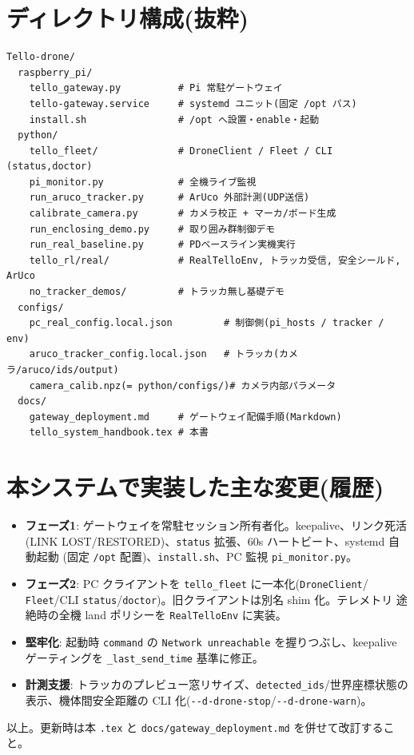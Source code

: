 \documentclass[11pt,a4paper]{ltjsarticle}
\newcommand{\code}[1]{\texttt{\small #1}}
\begin{document}
\section{ディレクトリ構成(抜粋)}
\begin{lstlisting}
Tello-drone/
  raspberry_pi/
    tello_gateway.py          # Pi 常駐ゲートウェイ
    tello-gateway.service     # systemd ユニット(固定 /opt パス)
    install.sh                # /opt へ設置・enable・起動
  python/
    tello_fleet/              # DroneClient / Fleet / CLI (status,doctor)
    pi_monitor.py             # 全機ライブ監視
    run_aruco_tracker.py      # ArUco 外部計測(UDP送信)
    calibrate_camera.py       # カメラ校正 + マーカ/ボード生成
    run_enclosing_demo.py     # 取り囲み群制御デモ
    run_real_baseline.py      # PDベースライン実機実行
    tello_rl/real/            # RealTelloEnv, トラッカ受信, 安全シールド, ArUco
    no_tracker_demos/         # トラッカ無し基礎デモ
  configs/
    pc_real_config.local.json         # 制御側(pi_hosts / tracker / env)
    aruco_tracker_config.local.json   # トラッカ(カメラ/aruco/ids/output)
    camera_calib.npz(= python/configs/)# カメラ内部パラメータ
  docs/
    gateway_deployment.md     # ゲートウェイ配備手順(Markdown)
    tello_system_handbook.tex # 本書
\end{lstlisting}

\section{本システムで実装した主な変更(履歴)}
\begin{itemize}[leftmargin=1.4em]
  \item \textbf{フェーズ1}: ゲートウェイを常駐セッション所有者化。keepalive、リンク死活
        (LINK LOST/RESTORED)、\code{status} 拡張、60s ハートビート、systemd 自動起動
        (固定 \code{/opt} 配置)、\code{install.sh}、PC 監視 \code{pi\_monitor.py}。
  \item \textbf{フェーズ2}: PC クライアントを \code{tello\_fleet} に一本化(\code{DroneClient}/
        \code{Fleet}/CLI \code{status}/\code{doctor})。旧クライアントは別名 shim 化。テレメトリ
        途絶時の全機 land ポリシーを \code{RealTelloEnv} に実装。
  \item \textbf{堅牢化}: 起動時 \code{command} の \code{Network unreachable} を握りつぶし、keepalive
        ゲーティングを \code{\_last\_send\_time} 基準に修正。
  \item \textbf{計測支援}: トラッカのプレビュー窓リサイズ、\code{detected\_ids}/世界座標状態の
        表示、機体間安全距離の CLI 化(\code{-{}-d-drone-stop}/\code{-{}-d-drone-warn})。
\end{itemize}

\vfill
\begin{center}\small 以上。更新時は本 \code{.tex} と \code{docs/gateway\_deployment.md} を併せて改訂すること。\end{center}
\end{document}
